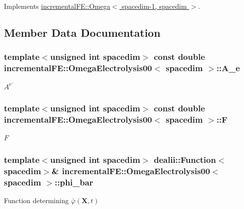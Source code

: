 Implements \hyperlink{classincremental_f_e_1_1_omega_a2f35d862aefa11151de5b7c7411e45df}{incremental\+F\+E\+::\+Omega$<$ spacedim-\/1, spacedim $>$}.



\subsection{Member Data Documentation}
\subsubsection[{\texorpdfstring{A\+\_\+e}{A_e}}]{\setlength{\rightskip}{0pt plus 5cm}template$<$unsigned int spacedim$>$ const double {\bf incremental\+F\+E\+::\+Omega\+Electrolysis00}$<$ spacedim $>$\+::A\+\_\+e\hspace{0.3cm}{\ttfamily [private]}}\hypertarget{classincremental_f_e_1_1_omega_electrolysis00_af015904f2eb09848ed82ca739410096e}{}\label{classincremental_f_e_1_1_omega_electrolysis00_af015904f2eb09848ed82ca739410096e}
$A^{\mathrm{e^-}}$ 
\subsubsection[{\texorpdfstring{F}{F}}]{\setlength{\rightskip}{0pt plus 5cm}template$<$unsigned int spacedim$>$ const double {\bf incremental\+F\+E\+::\+Omega\+Electrolysis00}$<$ spacedim $>$\+::F\hspace{0.3cm}{\ttfamily [private]}}\hypertarget{classincremental_f_e_1_1_omega_electrolysis00_ae7bb59bca61e20800d8f26b18ea91f87}{}\label{classincremental_f_e_1_1_omega_electrolysis00_ae7bb59bca61e20800d8f26b18ea91f87}
$F$ 
\subsubsection[{\texorpdfstring{phi\+\_\+bar}{phi_bar}}]{\setlength{\rightskip}{0pt plus 5cm}template$<$unsigned int spacedim$>$ dealii\+::\+Function$<$spacedim$>$\& {\bf incremental\+F\+E\+::\+Omega\+Electrolysis00}$<$ spacedim $>$\+::phi\+\_\+bar\hspace{0.3cm}{\ttfamily [private]}}\hypertarget{classincremental_f_e_1_1_omega_electrolysis00_ac489e8ba97912c01587b14b945cbf0b7}{}\label{classincremental_f_e_1_1_omega_electrolysis00_ac489e8ba97912c01587b14b945cbf0b7}
Function determining $\bar{\varphi}(\boldsymbol{X}, t)$ 
